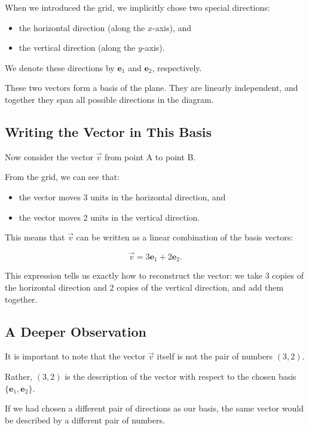 \documentclass[11pt,openany]{book}
\theoremstyle{definition}
\begin{document}
When we introduced the grid, we implicitly chose two special directions:

\begin{itemize}
  \item the horizontal direction (along the $x$-axis), and
  \item the vertical direction (along the $y$-axis).
\end{itemize}

We denote these directions by $\mathbf{e}_1$ and $\mathbf{e}_2$, respectively.

These two vectors form a basis of the plane. 
They are linearly independent, and together they span all possible directions in the diagram.

\medskip

\subsection{Writing the Vector in This Basis}

Now consider the vector $\vec{v}$ from point A to point B.

From the grid, we can see that:

\begin{itemize}
  \item the vector moves 3 units in the horizontal direction, and
  \item the vector moves 2 units in the vertical direction.
\end{itemize}

This means that $\vec{v}$ can be written as a linear combination of the basis vectors:

\[
\vec{v} = 3\mathbf{e}_1 + 2\mathbf{e}_2.
\]

This expression tells us exactly how to reconstruct the vector:
we take 3 copies of the horizontal direction and 2 copies of the vertical direction, and add them together.

\medskip

\subsection{A Deeper Observation}

It is important to note that the vector $\vec{v}$ itself is not the pair of numbers $(3,2)$.

Rather, $(3,2)$ is the description of the vector with respect to the chosen basis $\{\mathbf{e}_1, \mathbf{e}_2\}$.

If we had chosen a different pair of directions as our basis, the same vector would be described by a different pair of numbers.
\end{document}
